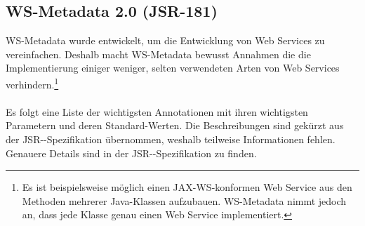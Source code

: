 \documentclass[runningheads]{llncs}
\begin{document}
  \label{jsr181}
  \subsection{WS-Metadata 2.0 (JSR-181)}
  \nocite{jsr_181}
    WS-Metadata wurde entwickelt, um die Entwicklung von Web Services zu vereinfachen. Deshalb macht WS-Metadata bewusst Annahmen die die Implementierung einiger weniger, selten verwendeten Arten von Web Services verhindern.\footnote{Es ist beispielsweise möglich einen JAX-WS-konformen Web Service aus den Methoden mehrerer Java-Klassen aufzubauen. WS-Metadata nimmt jedoch an, dass jede Klasse genau einen Web Service implementiert.}

    \paragraph{}
    Es folgt eine Liste der wichtigsten Annotationen mit ihren wichtigsten Pa\-ra\-me\-tern und deren Stan\-dard-\linebreak[0]Wer\-ten. Die Beschreibungen sind gekürzt aus der JSR--\linebreak[0]Spe\-zi\-fi\-ka\-tion\cite{jsr_181} übernommen, weshalb teilweise Informationen fehlen. Genauere Details sind in der JSR--\linebreak[0]Spe\-zi\-fi\-ka\-tion\cite{jsr_181} zu finden.\\ \vfill
\end{document}
